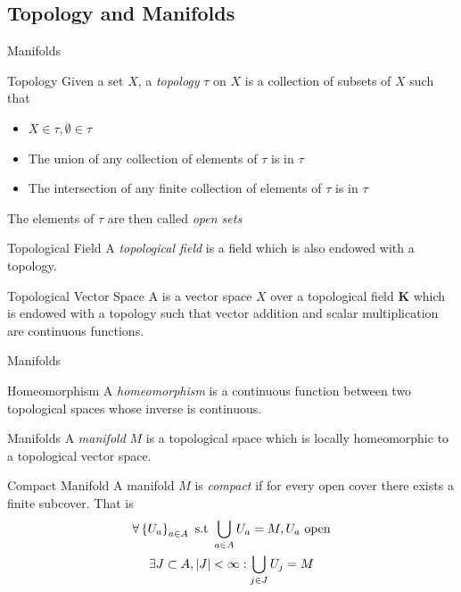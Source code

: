 \documentclass{beamer}
\begin{document}
  \subsection{Topology and Manifolds}
  \begin{frame}{Manifolds}
      \linespread{0.9}
      \pause
      \begin{block}{Topology}
          Given a set $X$, a \textit{topology} $\tau$ on $X$ is a collection of
          subsets of $X$ such that
          \begin{itemize}
              \item $X \in \tau, \emptyset \in \tau$
              \item The union of any collection of elements of $\tau$ is in
                  $\tau$
              \item The intersection of any \alert{finite} collection of
                  elements of $\tau$ is in $\tau$
          \end{itemize}
          The elements of $\tau$ are then called \textit{open sets}
      \end{block}
      \pause
      \begin{block}{Topological Field}
          A \textit{topological field} is a field which is also endowed with a
          topology.
      \end{block}
      \pause
      \begin{block}{Topological Vector Space}
          A  is a vector space $X$ over a
          topological field $\mathbf{K}$ which is endowed with a topology such
          that vector addition and scalar multiplication are continuous
          functions.
      \end{block}
  \end{frame}
  \begin{frame}{Manifolds}
      \linespread{0.8}
      \pause
      \begin{block}{Homeomorphism}
          A \textit{homeomorphism} is a continuous function between two
          topological spaces whose inverse is continuous.
      \end{block}
      \pause
      \begin{block}{Manifolds}
          A \textit{manifold} $M$ is a topological space which is locally
          homeomorphic to a topological vector space.
      \end{block}
      \pause
      \begin{block}{Compact Manifold}
          A manifold $M$ is \textit{compact} if for every open cover there
          exists a finite subcover. That is
          \begin{multline*}
              \linespread{0.8}
          \forall \left\{U_a\right\}_{a \in A} \textrm{ s.t } \bigcup_{a\in A}
          U_a = M,
          U_a \textrm{ open}\\
          \exists J \subset A, |J| < \infty : \bigcup_{j \in J}U_j = M
          \end{multline*}
      \end{block}
  \end{frame}
\end{document}
